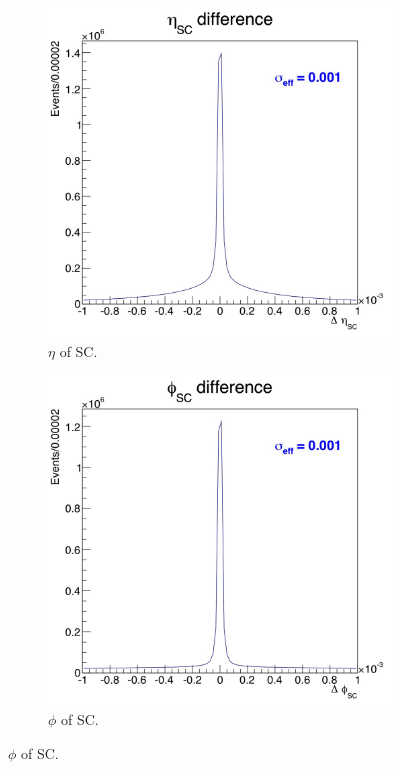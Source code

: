 \documentclass[10pt]{article}
\begin{document}
\begin{figure}[h!]
\begin{subfigure}[b]{0.24\textwidth}
        \end{subfigure}
        ~ %
        \begin{subfigure}[b]{0.24\textwidth}
                \includegraphics[width=\textwidth]{fullRunPlots/etaSC}
                \caption{$\eta$ of SC.}
            
        \end{subfigure}
         \begin{subfigure}[b]{0.24\textwidth}
                \includegraphics[width=\textwidth]{fullRunPlots/phiSC}
                \caption{$\phi$ of SC.}
             

\end{subfigure}
\end{figure}
\end{document}
